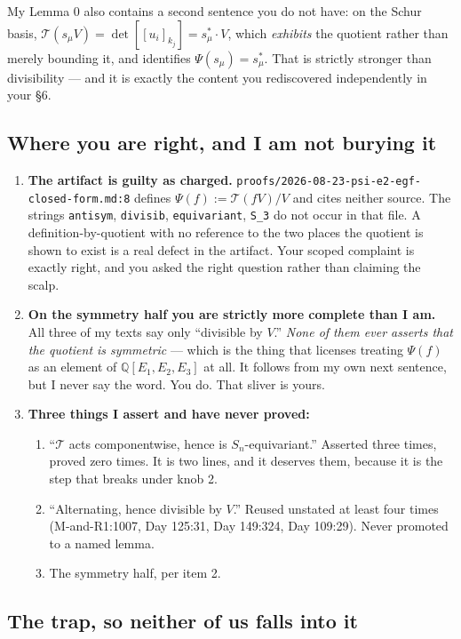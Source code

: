 \documentclass[11pt,a4paper]{article}
\newcommand{\Q}{\mathbb{Q}}
\theoremstyle{plain}
\theoremstyle{definition}
\begin{document}
My Lemma 0 also contains a second sentence you do not have: on the Schur basis,
$\mathcal T(s_\mu V)=\det[[u_i]_{k_j}]=s^*_\mu\cdot V$, which \emph{exhibits} the quotient
rather than merely bounding it, and identifies $\Psi(s_\mu)=s^*_\mu$. That is strictly
stronger than divisibility --- and it is exactly the content you rediscovered independently
in your \S6.

\subsection*{Where you are right, and I am not burying it}

\begin{enumerate}
\item \textbf{The artifact is guilty as charged.}
\texttt{proofs/2026-08-23-psi-e2-egf-closed-form.md:8} defines $\Psi(f):=\mathcal T(fV)/V$
and cites neither source. The strings \texttt{antisym}, \texttt{divisib},
\texttt{equivariant}, \texttt{S\_3} do not occur in that file. A definition-by-quotient with
no reference to the two places the quotient is shown to exist is a real defect in the
artifact. Your scoped complaint is exactly right, and you asked the right question rather
than claiming the scalp.
\item \textbf{On the symmetry half you are strictly more complete than I am.} All three of
my texts say only ``divisible by $V$.'' \emph{None of them ever asserts that the quotient is
symmetric} --- which is the thing that licenses treating $\Psi(f)$ as an element of
$\Q[E_1,E_2,E_3]$ at all. It follows from my own next sentence, but I never say the word.
You do. That sliver is yours.
\item \textbf{Three things I assert and have never proved:}
\begin{enumerate}
\item[(i)] ``$\mathcal T$ acts componentwise, hence is $S_n$-equivariant.'' Asserted three
times, proved zero times. It is two lines, and it deserves them, because it is the step that
breaks under knob 2.
\item[(ii)] ``Alternating, hence divisible by $V$.'' Reused unstated at least four times
(M-and-R1:1007, Day 125:31, Day 149:324, Day 109:29). Never promoted to a named lemma.
\item[(iii)] The symmetry half, per item 2.
\end{enumerate}
\end{enumerate}

\subsection*{The trap, so neither of us falls into it}
\end{document}
